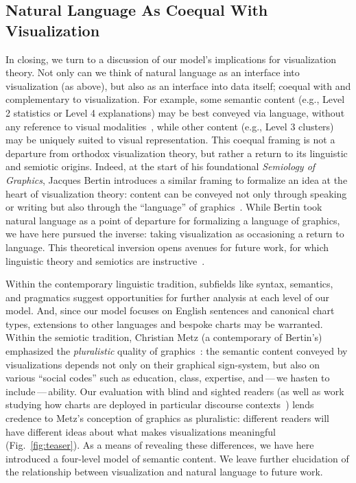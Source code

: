 \subsection{Natural Language As Coequal With Visualization}
\label{section:theoreticalImplications}

{In closing, we turn to a discussion of our model's implications for visualization theory.}
Not only can we think of natural language as an interface into visualization (as above), but also as an interface into data itself; coequal with and complementary to visualization.
For example, some semantic content (e.g., Level 2 statistics or Level 4 explanations) may be best conveyed via language, without any reference to visual modalities~\cite{potluri_examining_2021, hearst_would_2019}, while other content (e.g., Level 3 clusters) may be uniquely suited to visual representation.
This coequal framing is not a departure from orthodox visualization theory, but rather a return to its linguistic and semiotic origins.
Indeed, at the start of his foundational \emph{Semiology of Graphics}, Jacques Bertin introduces a similar framing to formalize an idea at the heart of visualization theory: content can be conveyed not only through speaking or writing but also through the ``language'' of graphics~\cite{bertin_semiology_1983}.
While Bertin took natural language as a point of departure for formalizing a language of graphics, we have here pursued the inverse: taking visualization as occasioning a return to language.
This theoretical inversion opens avenues for future work, for which linguistic theory and semiotics are instructive~\cite{weber_towards_2019, maceachren_visual_2012, vickers_understanding_2013}.

Within the contemporary linguistic tradition, subfields like syntax, semantics, and pragmatics suggest opportunities for further analysis at each level of our model. And, since our model focuses on English sentences and canonical chart types, extensions to other languages and bespoke charts may be warranted.
Within the semiotic tradition, Christian Metz (a contemporary of Bertin's) emphasized the \emph{pluralistic} quality of graphics~\cite{campolo_signs_2020}: the semantic content conveyed by visualizations depends not only on their graphical sign-system, but also on various ``social codes'' such as education, class, expertise, and\,---\,we hasten to include\,---\,ability.
Our evaluation with blind and sighted readers (as well as work studying how charts are deployed in particular discourse contexts~\cite{hullman_visualization_2011, hullman_content_2015, lee_viral_2021, aiello_inventorizing_2020}) 
lends credence to Metz's conception of graphics as pluralistic: different readers will have different ideas about what makes visualizations meaningful (Fig.~\ref{fig:teaser}).
As a means of revealing these differences, we have here introduced a four-level model of semantic content.
We leave further elucidation of the relationship between visualization and natural language to future work.